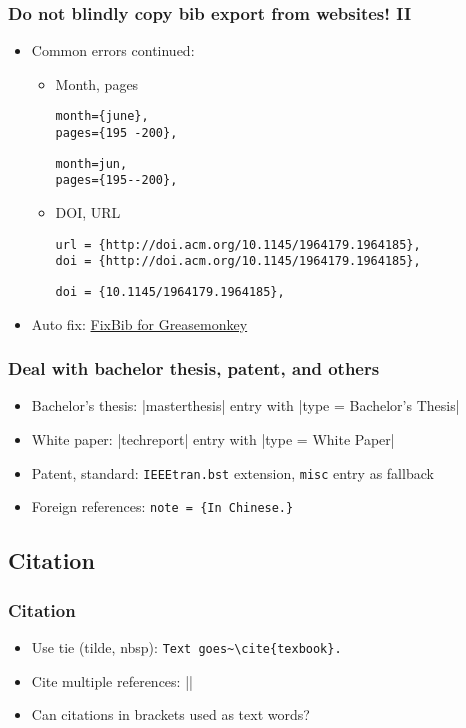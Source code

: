 \documentclass[CJKchecksingle]{beamer}
\begin{document}
\begin{frame}[fragile]
  \frametitle{Do not blindly copy bib export from websites! II}
  \begin{itemize}
    \item Common errors continued:
      \begin{itemize}
        \item
          Month, pages
\begin{lstlisting}[style=wrong]
month={june},
pages={195 -200},
\end{lstlisting}
\begin{lstlisting}
month=jun,
pages={195--200},
\end{lstlisting}
\pause
        \item
          DOI, URL
\begin{lstlisting}[style=wrong]
url = {http://doi.acm.org/10.1145/1964179.1964185},
doi = {http://doi.acm.org/10.1145/1964179.1964185},
\end{lstlisting}
\begin{lstlisting}
doi = {10.1145/1964179.1964185},
\end{lstlisting}
      \end{itemize}
    \pause
    \item
      Auto fix: \href{https://github.com/alick9188/fixbib}{FixBib
      for Greasemonkey}
  \end{itemize}

\end{frame}

\begin{frame}[fragile]\frametitle{Deal with bachelor thesis, patent, and others}

\begin{itemize}
  \item Bachelor's thesis: |masterthesis| entry with |type = {Bachelor's Thesis}|
  \item White paper: |techreport| entry with |type = {White Paper}|
  \item Patent, standard: \lstinline[style=cli]|IEEEtran.bst|
    extension, \lstinline{misc} entry as fallback
  \item Foreign references: \lstinline|note = {In Chinese.}|
\end{itemize}

\end{frame}


\subsection{Citation}
\begin{frame}[fragile]\frametitle{Citation}

\begin{itemize}
\item
  Use tie (tilde, nbsp): \lstinline|Text goes~\cite{texbook}.|
\item
  Cite multiple references: |\cite{ref1,ref2,ref3}|
\pause
\item
  Can citations in brackets used as text words?
\end{itemize}

\end{frame}
\end{document}
